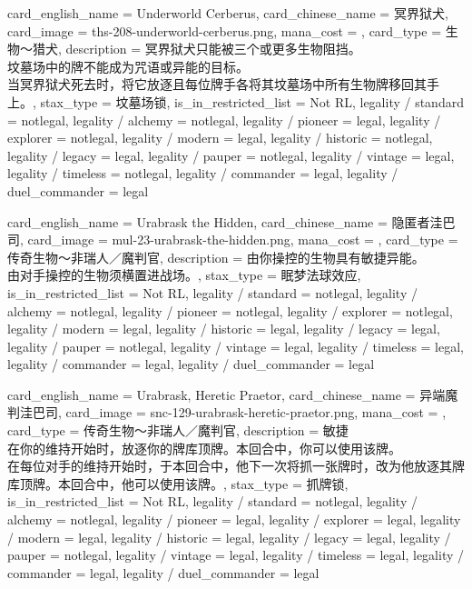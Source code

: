 \documentclass[lang = cn, color = black, 10pt]{AllThatStax}
\begin{document}
\card
{
	card_english_name = {Underworld Cerberus},
	card_chinese_name = {冥界狱犬},
	card_image = ths-208-underworld-cerberus.png,
	mana_cost = ,
	card_type = 生物～猎犬,
	description = {冥界狱犬只能被三个或更多生物阻挡。\\
坟墓场中的牌不能成为咒语或异能的目标。\\
当冥界狱犬死去时，将它放逐且每位牌手各将其坟墓场中所有生物牌移回其手上。},
	stax_type = 坟墓场锁,
	is_in_restricted_list = Not RL,
	legality / standard = notlegal,
	legality / alchemy = notlegal,
	legality / pioneer = legal,
	legality / explorer = notlegal,
	legality / modern = legal,
	legality / historic = notlegal,
	legality / legacy = legal,
	legality / pauper = notlegal,
	legality / vintage = legal,
	legality / timeless = notlegal,
	legality / commander = legal,
	legality / duel_commander = legal
}

\card
{
	card_english_name = {Urabrask the Hidden},
	card_chinese_name = {隐匿者洼巴司},
	card_image = mul-23-urabrask-the-hidden.png,
	mana_cost = ,
	card_type = 传奇生物～非瑞人／魔判官,
	description = {由你操控的生物具有敏捷异能。\\
由对手操控的生物须横置进战场。},
	stax_type = 眠梦法球效应,
	is_in_restricted_list = Not RL,
	legality / standard = notlegal,
	legality / alchemy = notlegal,
	legality / pioneer = notlegal,
	legality / explorer = notlegal,
	legality / modern = legal,
	legality / historic = legal,
	legality / legacy = legal,
	legality / pauper = notlegal,
	legality / vintage = legal,
	legality / timeless = legal,
	legality / commander = legal,
	legality / duel_commander = legal
}

\card
{
	card_english_name = {Urabrask, Heretic Praetor},
	card_chinese_name = {异端魔判洼巴司},
	card_image = snc-129-urabrask-heretic-praetor.png,
	mana_cost = ,
	card_type = 传奇生物～非瑞人／魔判官,
	description = {敏捷\\
在你的维持开始时，放逐你的牌库顶牌。本回合中，你可以使用该牌。\\
在每位对手的维持开始时，于本回合中，他下一次将抓一张牌时，改为他放逐其牌库顶牌。本回合中，他可以使用该牌。},
	stax_type = 抓牌锁,
	is_in_restricted_list = Not RL,
	legality / standard = notlegal,
	legality / alchemy = notlegal,
	legality / pioneer = legal,
	legality / explorer = legal,
	legality / modern = legal,
	legality / historic = legal,
	legality / legacy = legal,
	legality / pauper = notlegal,
	legality / vintage = legal,
	legality / timeless = legal,
	legality / commander = legal,
	legality / duel_commander = legal
}
\end{document}
